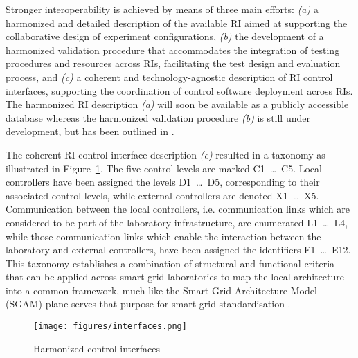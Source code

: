 \documentclass[runningheads,a4paper]{llncs}
\begin{document}
Stronger interoperability is achieved by means of three main efforts: \textit{(a)} a harmonized and detailed description of the available RI aimed at supporting the collaborative design of experiment configurations, \textit{(b)} the development of a harmonized validation procedure that accommodates the integration of testing procedures and resources across RIs, facilitating the test design and evaluation process, and \textit{(c)} a coherent and technology-agnostic description of RI control interfaces, supporting the coordination of control software deployment across RIs. The harmonized RI description \textit{(a)} will soon be available as a publicly accessible database whereas the harmonized validation procedure \textit{(b)} is still under development, but has been outlined in \cite{Blank:2016}.

The coherent RI control interface description \textit{(c)} resulted in a taxonomy as illustrated in Figure~\ref{fig:harmonized_control_interfaces}. The five control levels are marked C1~\dots~C5. Local controllers have been assigned the levels D1~\dots~D5, corresponding to their associated control levels, while external controllers are denoted X1~\dots~X5. Communication between the local controllers, i.e. communication links which are considered to be part of the laboratory infrastructure, are enumerated L1~\dots~L4, while those communication links which enable the interaction between the laboratory and external controllers, have been assigned the identifiers E1~\dots~E12. This taxonomy establishes a combination of structural and functional criteria that can be applied across smart grid laboratories to map the local architecture into a common framework, much like the Smart Grid Architecture Model (SGAM) plane serves that purpose for smart grid standardisation \cite{Uslar:2012}. 

\begin{figure}[!htbp]
	\centering
	\texttt{[image: figures/interfaces.png]}
	\caption{Harmonized control interfaces}
	\label{fig:harmonized_control_interfaces}
\end{figure}

\end{document}
